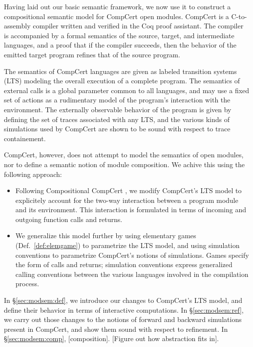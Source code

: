 \documentclass[acmsmall,timestamp,review,anonymous]{acmart}
\begin{document}
Having laid out our basic semantic framework,
we now use it to construct a compositional semantic model
for CompCert open modules.
CompCert is a C-to-assembly compiler written and verified
in the Coq proof assistant.
The compiler is accompanied by
a formal semantics of the source, target, and intermediate languages,
and a proof that if the compiler succeeds,
then the behavior of the emitted target program
refines that of the source program.

The semantics of CompCert languages
are given as labeled transition systems (LTS)
modeling the overall execution of a complete program.
The semantics of external calls
is a global parameter common to all languages,
and may use a fixed set of actions as a rudimentary model
of the program's interaction with the environment.
The externally observable behavior of the program
is given by defining the set of traces associated with any LTS,
and the various kinds of simulations used by CompCert
are shown to be sound with respect to trace containement.

CompCert, however,
does not attempt to model the semantics of open modules,
nor to define a semantic notion of module composition.
We achive this using the following approach:
\begin{itemize}
\item Following Compositional CompCert \cite{compcompcert},
  we modify CompCert's LTS model
  to explicitely account for the two-way interaction
  between a program module and its environment.
  This interaction is formulated
  in terms of incoming and outgoing function calls and returns.
\item We generalize this model further by
  using elementary games (Def.~\ref{def:elemgame})
  to parametrize the LTS model, and
  using simulation conventions to parametrize
  CompCert's notions of simulations.
  Games specify the form of calls and returns;
  simulation conventions express
  generalized calling conventions between the various
  languages involved in the compilation process.
\end{itemize}

In \S\ref{sec:modsem:def},
we introduce our changes to CompCert's LTS model,
and define their behavior in terms of interactive computations.
In \S\ref{sec:modsem:ref},
we carry out those changes to the notions of
forward and backward simulations
present in CompCert,
and show them sound with respect to refinement.
In \S\ref{sec:modsem:comp},
[composition].
[Figure out how abstraction fits in].
\end{document}
